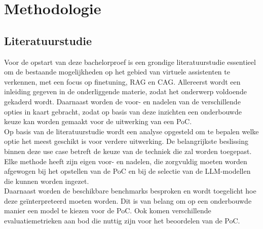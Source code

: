 
\chapter{Methodologie}
\label{ch:methodologie}


\section{Literatuurstudie}

Voor de opstart van deze bachelorproef is een grondige literatuurstudie essentieel om de bestaande mogelijkheden op het gebied van virtuele assistenten te verkennen, met een focus op finetuning, RAG en CAG. Allereerst wordt een inleiding gegeven in de onderliggende materie, zodat het onderwerp voldoende gekaderd wordt. Daarnaast worden de voor- en nadelen van de verschillende opties in kaart gebracht, zodat op basis van deze inzichten een onderbouwde keuze kan worden gemaakt voor de uitwerking van een PoC.
\\[1em]
Op basis van de literatuurstudie wordt een analyse opgesteld om te bepalen welke optie het meest geschikt is voor verdere uitwerking. De belangrijkste beslissing binnen deze use case betreft de keuze van de techniek die zal worden toegepast. Elke methode heeft zijn eigen voor- en nadelen, die zorgvuldig moeten worden afgewogen bij het opstellen van de PoC en bij de selectie van de LLM-modellen die kunnen worden ingezet.
\\[1em]
Daarnaast worden de beschikbare benchmarks besproken en wordt toegelicht hoe deze geïnterpreteerd moeten worden. Dit is van belang om op een onderbouwde manier een model te kiezen voor de PoC. Ook komen verschillende evaluatiemetrieken aan bod die nuttig zijn voor het beoordelen van de PoC.

